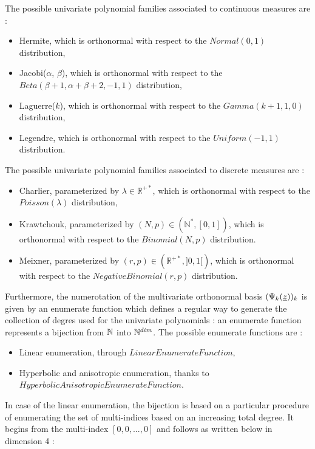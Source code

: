 The possible univariate polynomial families associated to continuous measures are :
\begin{itemize}
\item Hermite, which is orthonormal with respect to the  $Normal(0,1)$ distribution,
\item Jacobi($\alpha$, $\beta$), which is orthonormal with respect to the  $Beta(\beta + 1, \alpha + \beta + 2, -1, 1)$ distribution,
\item Laguerre($k$), which is orthonormal with respect to the  $Gamma(k+1,1,0)$ distribution,
\item Legendre, which is orthonormal with respect to the  $Uniform(-1,1)$ distribution.
\end{itemize}

The possible univariate polynomial families associated to discrete measures are :
\begin{itemize}
\item Charlier, parameterized by $\lambda \in \mathbb{R}^{+*}$, which is orthonormal with respect to the  $Poisson(\lambda)$ distribution,
\item Krawtchouk, parameterized by $(N,p)\in (\mathbb{N}^*, [0,1])$, which is orthonormal with respect to the  $Binomial(N,p)$ distribution.
\item Meixner, parameterized by $(r,p)\in (\mathbb{R}^{+*}, ]0,1[)$, which is orthonormal with respect to the  $NegativeBinomial(r,p)$ distribution.
\end{itemize}


Furthermore, the numerotation of the multivariate orthonormal basis $(\Psi_k({\underline{z}}))_k$ is given by an enumerate function which defines a regular way to generate the collection of degres used for the univariate polynomials : an enumerate function represents a bijection from ${\mathbb N}$ into ${\mathbb N}^{dim}$.
The possible enumerate functions are :
\begin{itemize}
  \item Linear enumeration, through $LinearEnumerateFunction$,
  \item Hyperbolic and anisotropic enumeration, thanks to $HyperbolicAnisotropicEnumerateFunction$.
\end{itemize}

In case of the linear enumeration, the bijection is based on a particular procedure of enumerating the set of multi-indices based on an increasing total degree. It begins from the multi-index $[0,0,...,0]$ and follows as written below in dimension 4 : 

